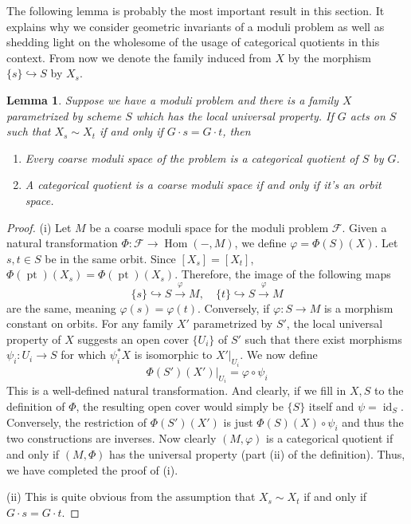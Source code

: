 \documentclass[12pt]{article}
\newtheorem{lemma}{Lemma}[section]
\theoremstyle{remark}
\theoremstyle{definition}
\newcommand{\Hom}[0]{\operatorname{Hom}}
\newcommand{\id}[0]{\operatorname{id}}
\newcommand{\pt}{\operatorname{pt}}
\begin{document}
    The following lemma is probably the most important result in this section. It explains why we consider geometric invariants of a moduli problem as well as shedding light on the wholesome of the usage of categorical quotients in this context. From now we denote the family induced from $X$ by the morphism $\{s\}\hookrightarrow S$ by $X_s$.
    \begin{lemma}
        Suppose we have a moduli problem and there is a family $X$ parametrized by scheme $S$ which has the local universal property. If $G$ acts on $S$ such that $X_s\sim X_t$ if and only if $G\cdot s=G\cdot t$, then
        \begin{enumerate}[\normalfont(i)]
            \item Every coarse moduli space of the problem is a categorical quotient of $S$ by $G$.
            \item A categorical quotient is a coarse moduli space if and only if it's an orbit space.
        \end{enumerate}
    \end{lemma}
    \begin{proof}
        (i) Let $M$ be a coarse moduli space for the moduli problem $\mathcal F$. Given a natural transformation $\Phi:\mathcal F\to \Hom(-, M)$, we define $\varphi=\Phi(S)(X)$. Let $s,t\in S$ be in the same orbit. Since $[X_s]=[X_t]$, $\Phi(\pt)(X_s)=\Phi(\pt)(X_s)$. Therefore, the image of the following maps
        \[\{s\}\hookrightarrow S\xrightarrow{\varphi}M,\quad\{t\}\hookrightarrow S\xrightarrow{\varphi}M\]
        are the same, meaning $\varphi(s)=\varphi(t)$. Conversely, if $\varphi:S\to M$ is a morphism constant on orbits. For any family $X'$ parametrized by $S'$, the local universal property of $X$ suggests an open cover $\{U_i\}$ of $S'$ such that there exist morphisms $\psi_i:U_i\to S$ for which $\psi_i^*X$ is isomorphic to $X'|_{U_i}$. We now define
        \[\Phi(S')(X')|_{U_i}=\varphi\circ\psi_i\]
        This is a well-defined natural transformation. And clearly, if we fill in $X, S$ to the definition of $\Phi$, the resulting open cover would simply be $\{S\}$ itself and $\psi=\id_S$. Conversely, the restriction of $\Phi(S')(X')$ is just $\Phi(S)(X)\circ\psi_i$ and thus the two constructions are inverses. Now clearly $(M,\varphi)$ is a categorical quotient if and only if $(M,\Phi)$ has the universal property (part (ii) of the definition). Thus, we have completed the proof of (i).

        (ii) This is quite obvious from the assumption that $X_s\sim X_t$ if and only if $G\cdot s=G \cdot t$. 
    \end{proof}
\end{document}
